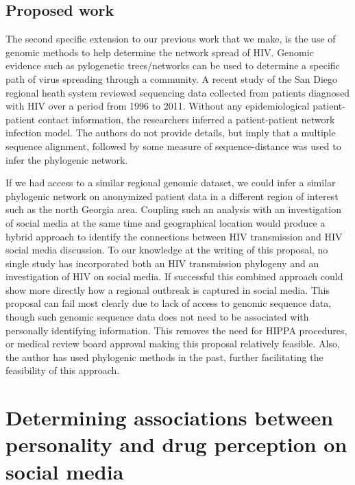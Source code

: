 

\subsection{Proposed work}

The second specific extension to our previous work that we make, is the use of genomic methods to help determine the network spread of HIV. Genomic evidence such as pylogenetic trees/networks can be used to determine a specific path of virus spreading through a community. A recent study of the San Diego regional heath system reviewed sequencing data collected from patients diagnosed with HIV over a period from 1996 to 2011\cite{little2014using}. Without any epidemiological patient-patient contact information, the researchers inferred a patient-patient network infection model. The authors do not provide details, but imply that a multiple sequence alignment, followed by some measure of sequence-distance was used to infer the phylogenic network.

If we had access to a similar regional genomic dataset, we could infer a similar phylogenic network on anonymized patient data in a different region of interest such as the north Georgia area. Coupling such an analysis with an investigation of social media at the same time and geographical location would produce a hybrid approach to identify the connections between HIV transmission and HIV social media discussion. To our knowledge at the writing of this proposal, no single study has incorporated both an HIV transmission phylogeny and an investigation of HIV on social media. If successful this combined approach could show more directly how a regional outbreak is captured in social media. This proposal can fail most clearly due to lack of access to genomic sequence data, though such genomic sequence data does not need to be associated with personally identifying information. This removes the need for HIPPA procedures, or medical review board approval making this proposal relatively feasible. Also, the author has used phylogenic methods in the past, further facilitating the feasibility of this approach.

\section{Determining associations between personality and drug perception on social media}

